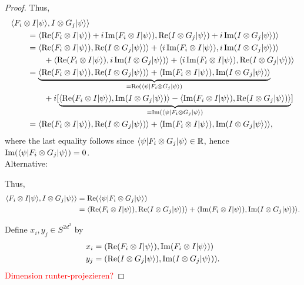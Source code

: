 \begin{proof}
	Thus,
	\begin{align*}
		&\sclr{F_i\tensor I \dr{\psi}}{I\tensor G_j \dr{\psi}}\\
		 &\qquad= \sclr{\Real(F_i\tensor I \dr{\psi})+i\Imag(F_i\tensor I \dr{\psi})}{\Real(I\tensor G_j \dr{\psi})+i\Imag(I\tensor G_j \dr{\psi})} \\
		&\qquad= \sclr{\Real(F_i\tensor I \dr{\psi})}{\Real(I\tensor G_j \dr{\psi})}+\sclr{i\Imag(F_i\tensor I \dr{\psi})}{i\Imag(I\tensor G_j \dr{\psi})}\\
		&\qquad\qquad+\sclr{\Real(F_i\tensor I \dr{\psi})}{i\Imag(I\tensor G_j \dr{\psi})}+\sclr{i\Imag(F_i\tensor I \dr{\psi})}{\Real(I\tensor G_j \dr{\psi})}\\
		&\qquad= \underbrace{\sclr{\Real(F_i\tensor I \dr{\psi})}{\Real(I\tensor G_j \dr{\psi})}+\sclr{\Imag(F_i\tensor I \dr{\psi})}{\Imag(I\tensor G_j \dr{\psi})}}_{=\Real(\dl{\psi} F_i\tensor G_j \dr{\psi})}\\
		&\qquad\qquad +i[\underbrace{\sclr{\Real(F_i\tensor I \dr{\psi})}{\Imag(I\tensor G_j \dr{\psi})}-\sclr{\Imag(F_i\tensor I \dr{\psi})}{\Real(I\tensor G_j \dr{\psi})}}_{=\Imag(\dl{\psi} F_i\tensor G_j \dr{\psi})}] \\
		&\qquad=\sclr{\Real(F_i\tensor I \dr{\psi})}{\Real(I\tensor G_j \dr{\psi})}+\sclr{\Imag(F_i\tensor I \dr{\psi})}{\Imag(I\tensor G_j \dr{\psi})},
	\end{align*}
	where the last equality follows since $\dl{\psi} F_i\tensor G_j \dr{\psi}\in\mathbb{R}$, hence $\Imag(\dl{\psi} F_i\tensor G_j \dr{\psi})=0$.\\
	
	Alternative:
	
	Thus,
	\begin{align*}
		\sclr{F_i\tensor I \dr{\psi}}{I\tensor G_j \dr{\psi}} &=\Real(\dl{\psi} F_i\tensor G_j \dr{\psi})\\
		&=\sclr{\Real(F_i\tensor I \dr{\psi})}{\Real(I\tensor G_j \dr{\psi})}+\sclr{\Imag(F_i\tensor I \dr{\psi})}{\Imag(I\tensor G_j \dr{\psi})}.
	\end{align*}
	
	Define $x_i,y_j \in S^{2d^2}$ by
	\begin{align}
		x_i &= (\Real(F_i\tensor I \dr{\psi}), \Imag(F_i\tensor I \dr{\psi}))\\
		y_j &= (\Real(I\tensor G_j \dr{\psi}), \Imag(I\tensor G_j \dr{\psi})).
	\end{align}
	\textcolor{red}{Dimension runter-projezieren?}
	

\end{proof}
